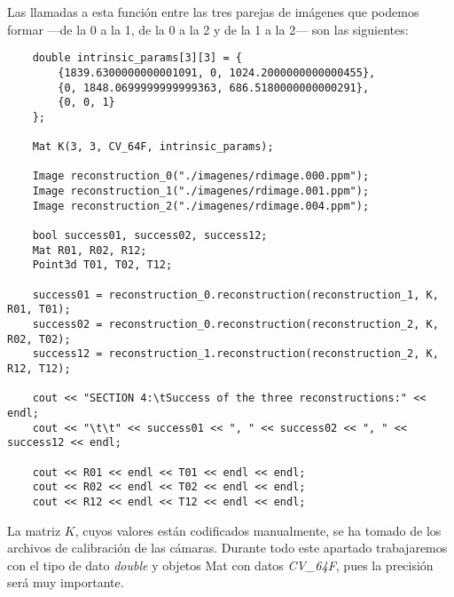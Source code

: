 \documentclass[a4paper, 11pt]{article}
\theoremstyle{definition}
\theoremstyle{theorem}
\begin{document}
    Las llamadas a esta función entre las tres parejas de imágenes que podemos formar ---de la 0 a la 1, de la 0 a la 2 y de la 1 a la 2--- son las siguientes:
    \begin{lstlisting}
    double intrinsic_params[3][3] = {
        {1839.6300000000001091, 0, 1024.2000000000000455},
        {0, 1848.0699999999999363, 686.5180000000000291},
        {0, 0, 1}
    };

    Mat K(3, 3, CV_64F, intrinsic_params);

    Image reconstruction_0("./imagenes/rdimage.000.ppm");
    Image reconstruction_1("./imagenes/rdimage.001.ppm");
    Image reconstruction_2("./imagenes/rdimage.004.ppm");

    bool success01, success02, success12;
    Mat R01, R02, R12;
    Point3d T01, T02, T12;

    success01 = reconstruction_0.reconstruction(reconstruction_1, K, R01, T01);
    success02 = reconstruction_0.reconstruction(reconstruction_2, K, R02, T02);
    success12 = reconstruction_1.reconstruction(reconstruction_2, K, R12, T12);

    cout << "SECTION 4:\tSuccess of the three reconstructions:" << endl;
    cout << "\t\t" << success01 << ", " << success02 << ", " << success12 << endl;

    cout << R01 << endl << T01 << endl << endl;
    cout << R02 << endl << T02 << endl << endl;
    cout << R12 << endl << T12 << endl << endl;
    \end{lstlisting}

    La matriz $K$, cuyos valores están codificados manualmente, se ha tomado de los archivos de calibración de las cámaras. Durante todo este apartado trabajaremos con el tipo de dato \emph{double} y objetos Mat con datos \emph{CV\_64F}, pues la precisión será muy importante.
\end{document}
